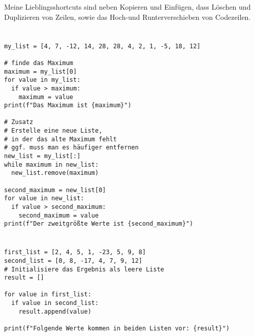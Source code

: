 \documentclass[a4paper]{article}
\begin{document}




\section{}
Meine Lieblingsshortcuts sind neben Kopieren und Einfügen, dass Löschen und Duplizieren von Zeilen, sowie das Hoch-und Runterverschieben von Codezeilen. 

\section{}
\begin{verbatim}
my_list = [4, 7, -12, 14, 28, 28, 4, 2, 1, -5, 18, 12]

# finde das Maximum
maximum = my_list[0]
for value in my_list:
  if value > maximum:
    maximum = value
print(f"Das Maximum ist {maximum}")

# Zusatz
# Erstelle eine neue Liste,
# in der das alte Maximum fehlt
# ggf. muss man es häufiger entfernen
new_list = my_list[:]
while maximum in new_list:
  new_list.remove(maximum)

second_maximum = new_list[0]
for value in new_list:
  if value > second_maximum:
    second_maximum = value
print(f"Der zweitgrößte Werte ist {second_maximum}")
\end{verbatim}

\section{} 
\begin{verbatim}
first_list = [2, 4, 5, 1, -23, 5, 9, 8]
second_list = [0, 8, -17, 4, 7, 9, 12]
# Initialisiere das Ergebnis als leere Liste
result = []

for value in first_list:
  if value in second_list:
    result.append(value)

print(f"Folgende Werte kommen in beiden Listen vor: {result}")
\end{verbatim}

\newpage 
\end{document}
